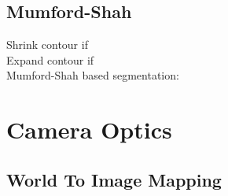 \documentclass[a4paper,12pt,pdftex]{scrreprt}
\begin{document}
	\section{Mumford-Shah} %
	\label{sec:mumford_shah}
	Shrink contour if \\
	Expand contour if \\
	Mumford-Shah based segmentation:\\

	\chapter{Camera Optics} %
	\label{cha:camera_optics}

	\section{World To Image Mapping} %
	\label{sec:world_to_image_mapping}
	
\end{document}
